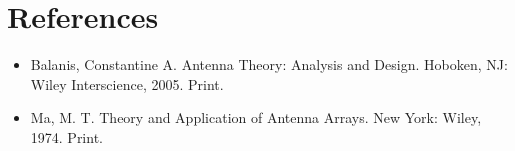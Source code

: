 \documentclass[UROP.tex]{subfiles}
\begin{document}
\bigskip
\section*{\Large References}
\begin{itemize}
	\item Balanis, Constantine A. Antenna Theory: Analysis and Design. Hoboken, NJ: Wiley Interscience, 2005. Print.
	\item Ma, M. T. Theory and Application of Antenna Arrays. New York: Wiley, 1974. Print.
\end{itemize}
\end{document}
